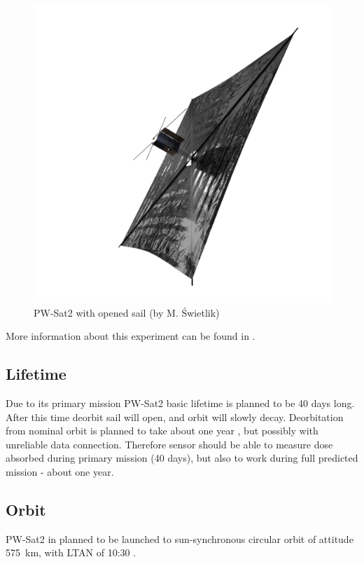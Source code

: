         \begin{figure}[H]
            \centering
            \includegraphics[width=0.7\paperwidth]{img/PW-Sat2_render_02.png}
            \caption{PW-Sat2 with opened sail (by M. Świetlik)}
            \label{PW-Sat_render_sail}
        \end{figure}

        More information about this experiment can be found in \cite{DDC_article}.

    \subsection{Lifetime}
        Due to its primary mission PW-Sat2 basic lifetime is planned to be 40 days long. After this time deorbit sail will open, and orbit will slowly decay. Deorbitation from nominal orbit is planned to take about one year \cite{PWSAT_MA_CDR}, but possibly with unreliable data connection. Therefore sensor should be able to measure dose absorbed during primary mission (40 days), but also to work during full predicted mission - about one year.

    \subsection{Orbit}
        PW-Sat2 in planned to be launched to sun-synchronous circular orbit of attitude \SI{575}{\kilo\meter}, with LTAN of 10:30 \cite{PWSAT_MA_CDR}.



